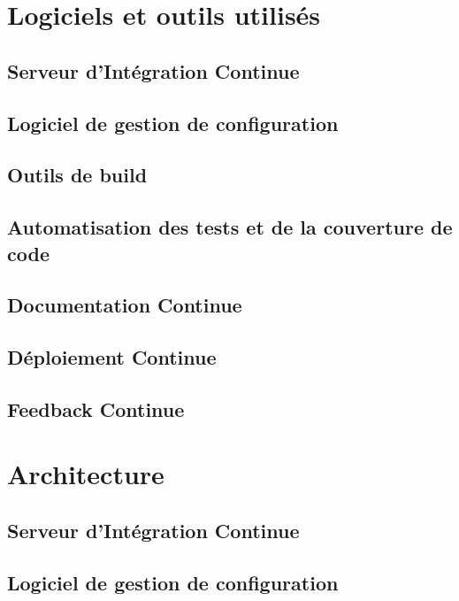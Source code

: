 \documentclass{report}
\begin{document}
      \section{Logiciels et outils utilisés}

        \subsection{Serveur d’Intégration Continue}

        \subsection{Logiciel de gestion de configuration}

        \subsection{Outils de build}

        \subsection{Automatisation des tests et de la couverture de code}

        \subsection{Documentation Continue}

        \subsection{Déploiement Continue}

        \subsection{Feedback Continue}

      \section{Architecture}

        \subsection{Serveur d’Intégration Continue}

        \subsection{Logiciel de gestion de configuration}
\end{document}
